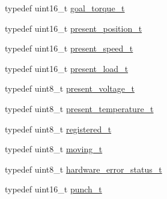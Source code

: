 \begin{DoxyCompactItemize}
\item 
typedef uint16\+\_\+t \hyperlink{structdynamixel_1_1servos_1_1_model_traits_3_01_xl320_01_4_1_1_c_t_a5f53d47ed903507c6a2e43e1a51156e2}{goal\+\_\+torque\+\_\+t}
\item 
typedef uint16\+\_\+t \hyperlink{structdynamixel_1_1servos_1_1_model_traits_3_01_xl320_01_4_1_1_c_t_aebfae8249b5b4b23da9f177f4270a9ed}{present\+\_\+position\+\_\+t}
\item 
typedef uint16\+\_\+t \hyperlink{structdynamixel_1_1servos_1_1_model_traits_3_01_xl320_01_4_1_1_c_t_a60db9022534011dc3c1b0846736d09b6}{present\+\_\+speed\+\_\+t}
\item 
typedef uint16\+\_\+t \hyperlink{structdynamixel_1_1servos_1_1_model_traits_3_01_xl320_01_4_1_1_c_t_ad9811c3a56f4bf49a7349c50642efbf5}{present\+\_\+load\+\_\+t}
\item 
typedef uint8\+\_\+t \hyperlink{structdynamixel_1_1servos_1_1_model_traits_3_01_xl320_01_4_1_1_c_t_ab3096fff6d4962cd657bbf3206ba2fc0}{present\+\_\+voltage\+\_\+t}
\item 
typedef uint8\+\_\+t \hyperlink{structdynamixel_1_1servos_1_1_model_traits_3_01_xl320_01_4_1_1_c_t_a7fea0e2689ba8bb6a8d07863aa9f6f7a}{present\+\_\+temperature\+\_\+t}
\item 
typedef uint8\+\_\+t \hyperlink{structdynamixel_1_1servos_1_1_model_traits_3_01_xl320_01_4_1_1_c_t_a96fdc830a1382e0352c5dcf7371f34ec}{registered\+\_\+t}
\item 
typedef uint8\+\_\+t \hyperlink{structdynamixel_1_1servos_1_1_model_traits_3_01_xl320_01_4_1_1_c_t_acf69989f806600c4d957dc40270e4e39}{moving\+\_\+t}
\item 
typedef uint8\+\_\+t \hyperlink{structdynamixel_1_1servos_1_1_model_traits_3_01_xl320_01_4_1_1_c_t_a1430b792b2d911dff66ba9c074002d14}{hardware\+\_\+error\+\_\+status\+\_\+t}
\item 
typedef uint16\+\_\+t \hyperlink{structdynamixel_1_1servos_1_1_model_traits_3_01_xl320_01_4_1_1_c_t_a1a822b0bd5ab67467f574132c450e117}{punch\+\_\+t}
\end{DoxyCompactItemize}

